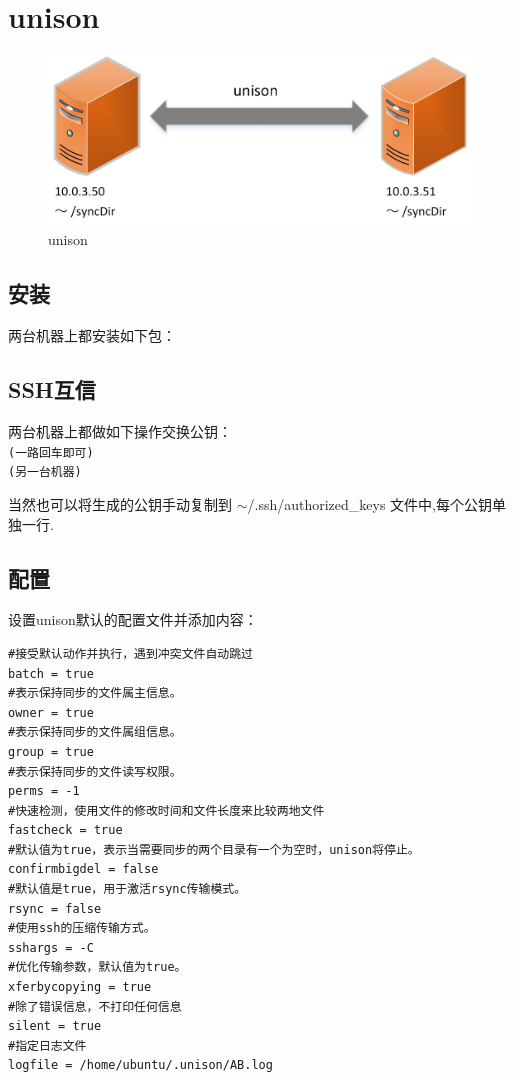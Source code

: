 \section{unison}
\begin{figure}[h]
\centering
\includegraphics[width=\textwidth]{pic/unison.jpg}
\caption{unison}
\end{figure}
\subsection{安装}
两台机器上都安装如下包：\\

\subsection{SSH互信}
两台机器上都做如下操作交换公钥：\\
 \quad\verb"(一路回车即可)"\\
 \quad\verb"(另一台机器)"\\ 
\par
当然也可以将生成的公钥手动复制到 $\sim$/.ssh/authorized\_keys 文件中,每个公钥单独一行.

\subsection{配置}
设置unison默认的配置文件并添加内容：\\
\begin{verbatim}
#接受默认动作并执行，遇到冲突文件自动跳过
batch = true
#表示保持同步的文件属主信息。
owner = true
#表示保持同步的文件属组信息。
group = true
#表示保持同步的文件读写权限。
perms = -1
#快速检测，使用文件的修改时间和文件长度来比较两地文件
fastcheck = true
#默认值为true，表示当需要同步的两个目录有一个为空时，unison将停止。
confirmbigdel = false
#默认值是true，用于激活rsync传输模式。
rsync = false
#使用ssh的压缩传输方式。
sshargs = -C
#优化传输参数，默认值为true。
xferbycopying = true
#除了错误信息，不打印任何信息
silent = true
#指定日志文件
logfile = /home/ubuntu/.unison/AB.log
\end{verbatim}

